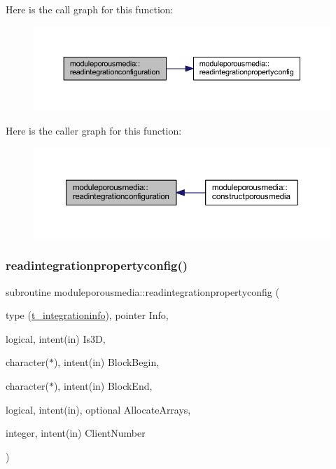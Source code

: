 Here is the call graph for this function\+:\nopagebreak
\begin{figure}[H]
\begin{center}
\leavevmode
\includegraphics[width=350pt]{namespacemoduleporousmedia_afd9c6f0efb919260c9cb27d5f27faf98_cgraph}
\end{center}
\end{figure}
Here is the caller graph for this function\+:\nopagebreak
\begin{figure}[H]
\begin{center}
\leavevmode
\includegraphics[width=350pt]{namespacemoduleporousmedia_afd9c6f0efb919260c9cb27d5f27faf98_icgraph}
\end{center}
\end{figure}
\mbox{\label{namespacemoduleporousmedia_af773f6dce68c6222d17ca3f4fe88192d}} 
\subsubsection{\texorpdfstring{readintegrationpropertyconfig()}{readintegrationpropertyconfig()}}
{\footnotesize\ttfamily subroutine moduleporousmedia\+::readintegrationpropertyconfig (\begin{DoxyParamCaption}\item[{type (\mbox{\hyperlink{structmoduleporousmedia_1_1t__integrationinfo}{t\+\_\+integrationinfo}}), pointer}]{Info,  }\item[{logical, intent(in)}]{Is3D,  }\item[{character($\ast$), intent(in)}]{Block\+Begin,  }\item[{character($\ast$), intent(in)}]{Block\+End,  }\item[{logical, intent(in), optional}]{Allocate\+Arrays,  }\item[{integer, intent(in)}]{Client\+Number }\end{DoxyParamCaption})\hspace{0.3cm}{\ttfamily [private]}}

